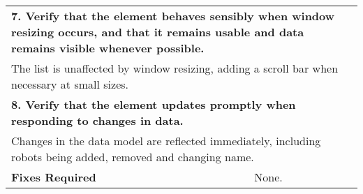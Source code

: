 \begin{longtable}{ l p{10cm} }
 \hline
 \multicolumn{2}{p{14cm}}{\textbf{7. Verify that the element behaves sensibly when window resizing occurs, and that it remains usable and data remains visible whenever possible.}}\\
 \multicolumn{2}{p{14cm}}{The list is unaffected by window resizing, adding a scroll bar when necessary at small sizes.}\\
 \hline
 \multicolumn{2}{p{14cm}}{\textbf{8. Verify that the element updates promptly when responding to changes in data.}}\\
 \multicolumn{2}{p{14cm}}{Changes in the data model are reflected immediately, including robots being added, removed and changing name.}\\
 \hline
 \textbf{Fixes Required} & None.\\
 \bottomrule
\end{longtable}
\clearpage

